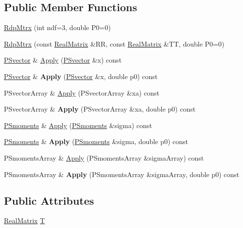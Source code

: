 \subsection*{Public Member Functions}
\begin{DoxyCompactItemize}
\item 
\hyperlink{classRdpMtrx_a9b50f0956d194a4465884c195665a942}{Rdp\+Mtrx} (int ndf=3, double P0=0)
\item 
\hyperlink{classRdpMtrx_a0ddcf357a2525db9c315eacbbf700e63}{Rdp\+Mtrx} (const \hyperlink{classTLAS_1_1Matrix}{Real\+Matrix} \&RR, const \hyperlink{classTLAS_1_1Matrix}{Real\+Matrix} \&TT, double P0=0)
\item 
\hyperlink{classPSvector}{P\+Svector} \& \hyperlink{classRdpMtrx_a5896c951a1fb9be559e6772757df78fb}{Apply} (\hyperlink{classPSvector}{P\+Svector} \&x) const
\item 
\mbox{\label{classRdpMtrx_aad837fd5689b665fef3ae6dc7323d219}} 
\hyperlink{classPSvector}{P\+Svector} \& {\bfseries Apply} (\hyperlink{classPSvector}{P\+Svector} \&x, double p0) const
\item 
P\+Svector\+Array \& \hyperlink{classRdpMtrx_a47ed4487db94625469b1bf36dfd8b00a}{Apply} (P\+Svector\+Array \&xa) const
\item 
\mbox{\label{classRdpMtrx_a2c71f7ba1bd77318ee5a54425f4e5906}} 
P\+Svector\+Array \& {\bfseries Apply} (P\+Svector\+Array \&xa, double p0) const
\item 
\hyperlink{classTPSMoments}{P\+Smoments} \& \hyperlink{classRdpMtrx_a54ac0d59f270749a5cd005bd9aa12955}{Apply} (\hyperlink{classTPSMoments}{P\+Smoments} \&sigma) const
\item 
\mbox{\label{classRdpMtrx_afd6450da82570e1f421be6f787ee4d24}} 
\hyperlink{classTPSMoments}{P\+Smoments} \& {\bfseries Apply} (\hyperlink{classTPSMoments}{P\+Smoments} \&sigma, double p0) const
\item 
P\+Smoments\+Array \& \hyperlink{classRdpMtrx_acaaf913bf301667d1b6b91d0ddc0f026}{Apply} (P\+Smoments\+Array \&sigma\+Array) const
\item 
\mbox{\label{classRdpMtrx_a287d3391a7bd9efc66cf42a102e5176a}} 
P\+Smoments\+Array \& {\bfseries Apply} (P\+Smoments\+Array \&sigma\+Array, double p0) const
\end{DoxyCompactItemize}
\subsection*{Public Attributes}
\begin{DoxyCompactItemize}
\item 
\hyperlink{classTLAS_1_1Matrix}{Real\+Matrix} \hyperlink{classRdpMtrx_a51af679232ea4866662715e629362efe}{T}
\end{DoxyCompactItemize}
